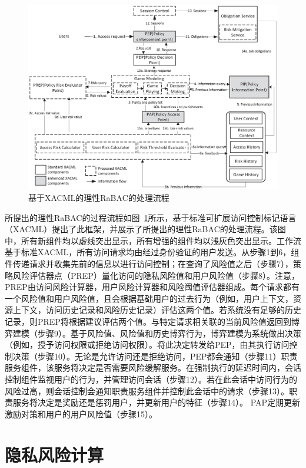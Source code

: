 \begin{figure}[htb]
	\centering
	\includegraphics[width=1\textwidth]{./figures/game-rbac-workflow.eps}
	\caption{基于XACML的理性RaBAC的处理流程}\label{fig:game-rbac-workflow}
\end{figure}


所提出的理性RaBAC的过程流程如图~\ref{fig:game-rbac-workflow}所示，基于标准可扩展访问控制标记语言（XACML）提出了此框架，并展示了所提出的理性RaBAC的处理流程。该图中，所有新组件均以虚线突出显示，所有增强的组件均以浅灰色突出显示。工作流基于标准XACML，所有访问请求均由经过身份验证的用户发送。从步骤1到6，组件传递请求并收集先前的信息以进行访问控制；在查询了风险值之后（步骤7），策略风险评估器点（PREP）量化访问的隐私风险值和用户风险值（步骤8）。注意，PREP由访问风险计算器，用户风险计算器和风险阈值评估器组成。每个请求都有一个风险值和用户风险值，且会根据基础用户的过去行为（例如，用户上下文，资源上下文，访问历史记录和风险历史记录）评估这两个值。若系统没有足够的历史记录，则PREP将根据建议评估两个值。与特定请求相关联的当前风险值返回到博弈建模（步骤9）。基于风险值、风险值和历史博弈行为，博弈建模为系统做出决策（例如，授予访问权限或拒绝访问权限）。将此决定转发给PEP，由其执行访问控制决策（步骤10）。无论是允许访问还是拒绝访问，PEP都会通知（步骤11）职责服务组件，该服务将决定是否需要风险缓解服务。在强制执行的延迟时间内，会话控制组件监视用户的行为，并管理访问会话（步骤12）。若在此会话中访问行为的风险过高，则会话控制会通知职责服务组件并控制此会话中的请求（步骤13）。职责服务将决定是奖励还是惩罚用户，并更新用户的特征（步骤14）。 PAP定期更新激励对策和用户的用户风险值（步骤15）。

\section{隐私风险计算}
\label{sec:riskvalue}

